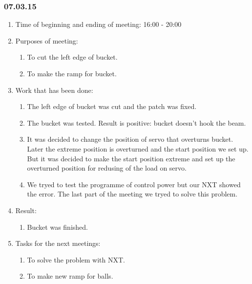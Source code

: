 \subsubsection{07.03.15}

\begin{enumerate}
	\item Time of beginning and ending of meeting:
	16:00 - 20:00
	\item Purposes of meeting:
	\begin{enumerate}
	  \item To cut the left edge of bucket.
	  
	  \item To make the ramp for bucket.
			  
    \end{enumerate}
   
	\item Work that has been done:
	\begin{enumerate}
		 \item The left edge of bucket was cut and the patch was fixed.
		 
		 \item The bucket was tested. Result is positive: bucket doesn't hook the beam.
		 
		 \item It was decided to change the position of servo that overturns bucket. Later the extreme position is overturned and the start position we set up. But it was decided to make the start position extreme and set up the overturned position for redusing of the load on servo.
		 
		 \item We tryed to test the programme of control power but our NXT showed the error. The last part of the meeting we tryed to solve this problem.		  		 		         				 		         	 		         	 		 		         		 		 			 		         
    \end{enumerate}
    
	\item Result: 
	\begin{enumerate}
	  \item Bucket was finished.
      
    \end{enumerate}
    
	\item Tasks for the next meetings:
	\begin{enumerate}
		\item To solve the problem with NXT.
		
		\item To make new ramp for balls.
    \end{enumerate}     
\end{enumerate}
\fillpage